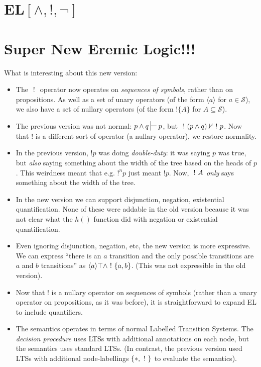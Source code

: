 \section{EL$[\land, !, \neg]$}

\section{Super New Eremic Logic!!!}
What is interesting about this new version:
\begin{itemize}
\item
The $\ ! \ $ operator now operates on \emph{sequences of symbols}, rather than on propositions.
As well as a set of unary operators (of the form $\langle a \rangle$ for $a \in \mathcal{S}$), we also have a set of nullary operators (of the form $!\{A\}$ for $A \subseteq \mathcal{S}$). 
\item
The previous version was not normal: $p \land q \judge p$, but $\ ! \  (p \land q) \nvdash \ ! \  p$. Now that ! is a different sort of operator (a nullary operator), we restore normality.
\item
In the previous version, $! p$ was doing \emph{double-duty}: it was saying $p$ was true, but \emph{also} saying something about the width of the tree based on the heads of $p$. This weirdness meant that e.g. $!^np$ just meant $!p$. Now, $\ ! \  A$ \emph{only} says something about the width of the tree. 
\item
In the new version we can support disjunction, negation, existential quantification. None of these were addable in the old version because it was not clear what the $h()$ function  did with negation or existential quantification.
\item
Even ignoring disjunction, negation, etc, the new version is more expressive. We can express ``there is an $a$ transition and the only possible transitions are $a$ and $b$ transitions'' as $\langle a \rangle \top \land \ ! \  \{a, b\}$. (This was not expressible in the old version).
\item
Now that $!$ is a nullary operator on sequences of symbols (rather than a unary operator on propositions, as it was before), it is straightforward to expand EL to include quantifiers.
\item
The semantics operates in terms of normal Labelled Transition Systems. The \emph{decision procedure} uses LTSs with additional annotations on each node, but the semantics uses standard LTSs. (In contrast, the previous version used LTSs with additional node-labellings $\{\ast, \ ! \ \}$ to evaluate the semantics).
\end{itemize}

